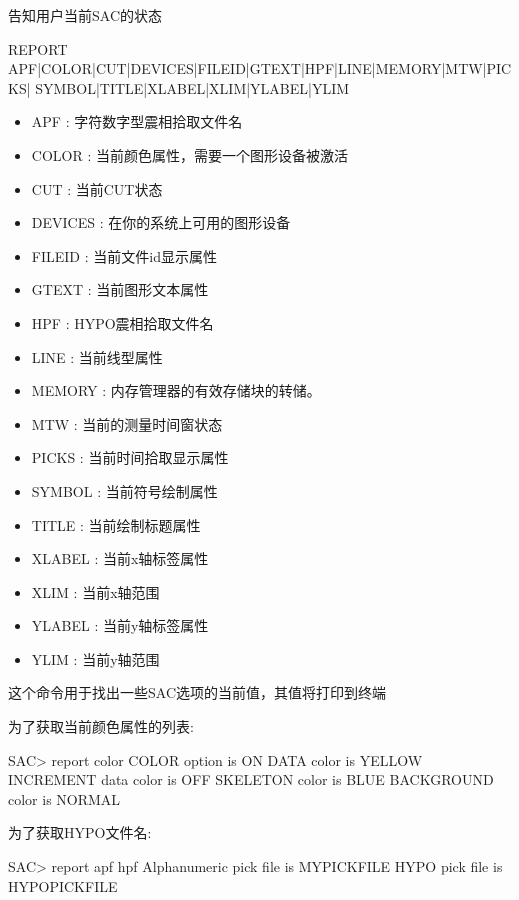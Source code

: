 \label{cmd:report}

告知用户当前SAC的状态

\begin{SACSTX}
REPORT APF|COLOR|CUT|DEVICES|FILEID|GTEXT|HPF|LINE|MEMORY|MTW|PICKS|
    SYMBOL|TITLE|XLABEL|XLIM|YLABEL|YLIM  
\end{SACSTX}

\begin{itemize}
\item APF : 字符数字型震相拾取文件名 
\item COLOR : 当前颜色属性，需要一个图形设备被激活 
\item CUT : 当前CUT状态 
\item DEVICES : 在你的系统上可用的图形设备 
\item FILEID : 当前文件id显示属性 
\item GTEXT : 当前图形文本属性 
\item HPF : HYPO震相拾取文件名 
\item LINE : 当前线型属性 
\item MEMORY : 内存管理器的有效存储块的转储。 
\item MTW : 当前的测量时间窗状态 
\item PICKS : 当前时间拾取显示属性 
\item SYMBOL : 当前符号绘制属性 
\item TITLE : 当前绘制标题属性 
\item XLABEL : 当前x轴标签属性 
\item XLIM : 当前x轴范围 
\item YLABEL : 当前y轴标签属性 
\item YLIM : 当前y轴范围 
\end{itemize} 

这个命令用于找出一些SAC选项的当前值，其值将打印到终端

为了获取当前颜色属性的列表:
\begin{SACCode}
SAC> report color
 COLOR option is ON
 DATA color is YELLOW
 INCREMENT data color is OFF
 SKELETON color is BLUE
 BACKGROUND color is NORMAL
\end{SACCode}

为了获取HYPO文件名:
\begin{SACCode}
SAC> report apf hpf
 Alphanumeric pick file is MYPICKFILE
 HYPO pick file is HYPOPICKFILE
\end{SACCode}
